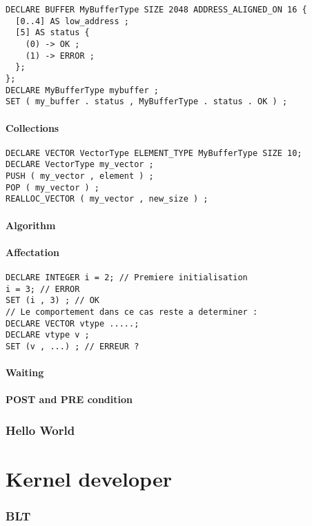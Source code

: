 \documentclass{rtxreport}
\begin{document}
\begin{lstlisting}
DECLARE BUFFER MyBufferType SIZE 2048 ADDRESS_ALIGNED_ON 16 {
  [0..4] AS low_address ;
  [5] AS status {
    (0) -> OK ;
    (1) -> ERROR ;
  };
};
DECLARE MyBufferType mybuffer ;
SET ( my_buffer . status , MyBufferType . status . OK ) ;
\end{lstlisting}

\subsubsection{Collections}

\begin{lstlisting}
DECLARE VECTOR VectorType ELEMENT_TYPE MyBufferType SIZE 10;
DECLARE VectorType my_vector ;
PUSH ( my_vector , element ) ;
POP ( my_vector ) ;
REALLOC_VECTOR ( my_vector , new_size ) ;
\end{lstlisting}

\subsubsection{Algorithm}

\subsubsection{Affectation}

\begin{lstlisting}
DECLARE INTEGER i = 2; // Premiere initialisation
i = 3; // ERROR
SET (i , 3) ; // OK
// Le comportement dans ce cas reste a determiner :
DECLARE VECTOR vtype .....;
DECLARE vtype v ;
SET (v , ...) ; // ERREUR ?
\end{lstlisting}


\subsubsection{Waiting}
\subsubsection{POST and PRE condition}

\subsection{Hello World}

\chapter{Kernel developer}
\subsection {BLT}

\rtxbibliography
\end{document}

